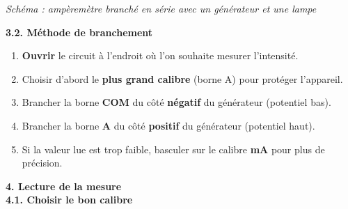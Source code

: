 \documentclass[11pt,a4paper]{article}
\begin{document}
\begin{center}
\end{center}

\begin{center}
\small\textit{Schéma : ampèremètre branché en série avec un générateur et une lampe}
\end{center}

\vspace{3mm}

\textbf{3.2. Méthode de branchement}

\begin{tcolorbox}[colback=red!5!white,colframe=red!75!black]
{
\begin{enumerate}
    \item \textbf{Ouvrir} le circuit à l'endroit où l'on souhaite mesurer l'intensité.
    \item Choisir d'abord le \textbf{plus grand calibre} (borne A) pour protéger l'appareil.
    \item Brancher la borne \textbf{COM} du côté \textbf{négatif} du générateur (potentiel bas).
    \item Brancher la borne \textbf{A} du côté \textbf{positif} du générateur (potentiel haut).
    \item Si la valeur lue est trop faible, basculer sur le calibre \textbf{mA} pour plus de précision.
\end{enumerate}
}
\end{tcolorbox}

\vspace{3mm}

\textbf{4. Lecture de la mesure} \\

\textbf{4.1. Choisir le bon calibre}
\end{document}
